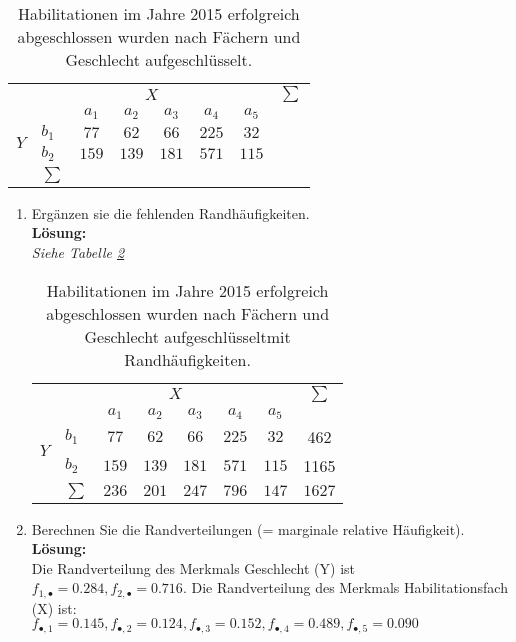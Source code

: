 \documentclass[11pt]{article}
\begin{document}
\begin{enumerate}
\begin{table}[h]
\centering
\begin{tabular}{l l|c|c|c|c|c|c}
\multicolumn{2}{c}{}&\multicolumn{4}{c}{$X$}& &$\sum$\\
\multicolumn{2}{c}{}&$a_{1}$& $a_{2}$& $a_{3}$& $a_{4}$ & $a_{5}$&\\
\cline{3-7}
\multirow{2}{*}{$Y$}& $b_{1}$ & $77 $ & $62$ &  $ 66$ & $225$ & $32$&\\
\cline{2-7}
& $b_{2}$ & $159$ & $139$ &  $181$ & $571$ & $115$&\\
\cline{2-7}
& $\sum$ &  &  &   &  & &\\
\end{tabular}
\caption{Habilitationen im Jahre 2015 erfolgreich abgeschlossen wurden nach Fächern und Geschlecht aufgeschlüsselt\label{tab4}.}
\end{table}
\begin{enumerate}
\item{Ergänzen sie die fehlenden Randhäufigkeiten.\\
\textbf{Lösung:}\\
\textit{Siehe Tabelle \ref{tab4_sol}}
\begin{table}[h]
\centering
\begin{tabular}{l l|c|c|c|c|c|c}
\multicolumn{2}{c}{}&\multicolumn{4}{c}{$X$}& &$\sum$\\
\multicolumn{2}{c}{}&$a_{1}$& $a_{2}$& $a_{3}$& $a_{4}$ & $a_{5}$&\\
\cline{3-7}
\multirow{2}{*}{$Y$}& $b_{1}$ & $77 $ & $62$ &  $ 66$ & $225$ & $32$&462\\
\cline{2-7}
& $b_{2}$ & $159$ & $139$ &  $181$ & $571$ & $115$&1165\\
\cline{2-7}
& $\sum$ & $236$ & $201$ & $247$   & $796$  & $147$ & $1627$\\
\end{tabular}
\caption{Habilitationen im Jahre 2015 erfolgreich abgeschlossen wurden nach Fächern und Geschlecht aufgeschlüsselt\label{tab4_sol} mit Randhäufigkeiten.}
\end{table}
} 
\item{Berechnen Sie die Randverteilungen (= marginale relative Häufigkeit).\\
\textbf{Lösung:}\\ Die Randverteilung des Merkmals Geschlecht (Y) ist
$f_{1,\bullet}=0.284, f_{2,\bullet}=0.716.$ Die Randverteilung des Merkmals Habilitationsfach (X)
ist:\\ $f_{\bullet,1}=0.145, f_{\bullet,2}=0.124, f_{\bullet,3}= 0.152, f_{\bullet,4}= 0.489,
f_{\bullet,5}= 0.090$
}



\end{enumerate}
\end{enumerate}
\end{document}
